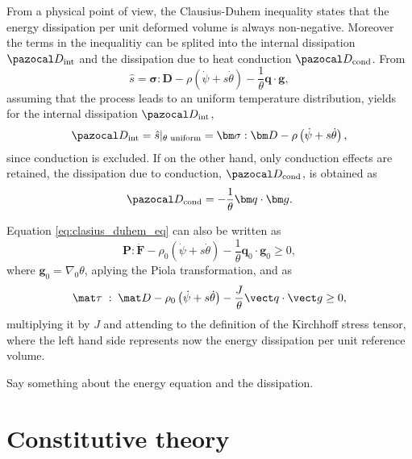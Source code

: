From a physical point of view, the Clausius-Duhem inequality states that the energy dissipation per unit deformed volume is always non-negative.
Moreover the terms in the inequalitiy can be splited into the internal dissipation \(\pazocal D_\text{int}\) and the dissipation due to heat conduction \(\pazocal D_\text{cond}\).
From
\begin{equation}
\hat s = \bm \sigma :\bm D - \rho \left(\dot \psi  +s \dot \theta\right) -\frac{1}{\theta}\bm q\cdot\bm g,
\end{equation}
assuming that the process leads to an uniform temperature distribution, yields for the internal dissipation \(\pazocal D_\text{int}\),
\begin{equation} \label{eq:def_int_dissipation}
\pazocal D_\text{int} = \hat{s}|_{\text{$\theta$ uniform} }= \bm \sigma:\bm D - \rho \left(\dot \psi + s \dot \theta\right),
\end{equation}
since conduction is excluded.
If on the other hand, only conduction effects are retained, the dissipation due to conduction, \(\pazocal D_\text{cond}\), is obtained as
\begin{equation} \label{eq:dissipation_conduction}
\pazocal D_\text{cond} = - \frac{1}{\theta} \bm q\cdot \bm g.
\end{equation}

Equation \eqref{eq:clasius_duhem_eq} can also be written as
\begin{equation}
  \bm P\colon\dot{\bm F} - \rho_0(\dot\psi + s\dot \theta) - \frac{1}{\theta}\bm q_0\cdot \bm g_0 \geq 0,
\end{equation}
where \(\bm g_0 = \nabla_0 \theta\), aplying the Piola transformation, and as
\begin{equation}
    \mat \tau\;:\;\mat D -\rho_0\left(\dot\psi + s\dot \theta\right) -\frac{J}{\theta}\vect q\cdot \vect g \geq 0,
\end{equation}
multiplying it by $J$ and attending to the definition of the Kirchhoff stress tensor, where the left hand side represents now the energy dissipation per unit reference volume.

\colorbox{BrickRed}{Say something about the energy equation and the dissipation.}

\section{Constitutive theory} \label{sec:thermomechanical_constitutive}


